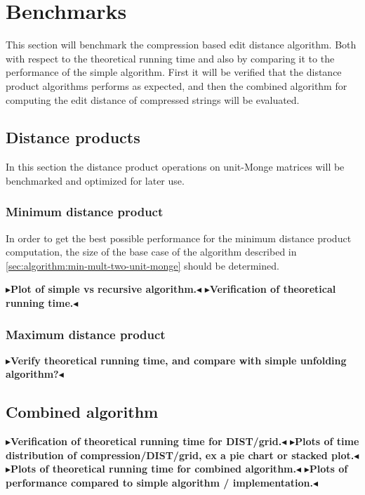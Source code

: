 \documentclass[twoside,11pt,openright]{report}
\newcommand{\todo}[1]{{\color[rgb]{.5,0,0}\textbf{$\blacktriangleright$#1$\blacktriangleleft$}}}
\begin{document}
\section{Benchmarks}
\label{sec:algorithm:benchmarks}
This section will benchmark the compression based edit distance algorithm. Both with respect to the theoretical running time and also by comparing it to the performance of the simple algorithm. First it will be verified that the distance product algorithms performs as expected, and then the combined algorithm for computing the edit distance of compressed strings will be evaluated.

\subsection{Distance products}
In this section the distance product operations on unit-Monge matrices will be benchmarked and optimized for later use.

\subsubsection{Minimum distance product}
In order to get the best possible performance for the minimum distance product computation, the size of the base case of the algorithm described in \cref{sec:algorithm:min-mult-two-unit-monge} should be determined.

\todo{Plot of simple vs recursive algorithm.}
\todo{Verification of theoretical running time.}

\subsubsection{Maximum distance product}
\todo{Verify theoretical running time, and compare with simple unfolding algorithm?}

\subsection{Combined algorithm}
\todo{Verification of theoretical running time for DIST/grid.}
\todo{Plots of time distribution of compression/DIST/grid, ex a pie chart or stacked plot.}
\todo{Plots of theoretical running time for combined algorithm.}
\todo{Plots of performance compared to simple algorithm / implementation.}
\end{document}
